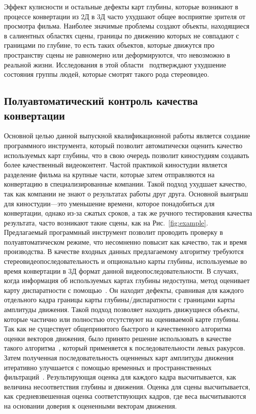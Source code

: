 \documentclass[14pt, a4paper]{extarticle}
\begin{document}
Эффект кулисности и остальные дефекты карт глубины, которые возникают в процессе 
конвертации из 2Д в 3Д часто ухудшают общее восприятие зрителя от просмотра фильма. 
Наиболее значимые проблемы создают объекты, находящиеся в салиентных областях 
сцены, границы по движению которых не совпадают с границами по глубине, то есть 
таких объектов, которые движутся про пространству сцены не равномерно или деформируются, 
что невозможно в реальной жизни. Исследования в этой области~\cite{jung2012visual,li2014visual} 
подтверждают ухудшение состояния группы людей, которые смотрят такого рода стереовидео.

\subsection{Полуавтоматический контроль качества конвертации}



Основной целью данной выпускной квалификационной работы 
является создание программного инструмента, 
который позволит автоматически оценить качество используемых карт глубины,
что в свою очередь позволит киностудиям создавать более качественный видеоконтент. 
Частой практикой киностудии является разделение фильма на крупные части, которые 
затем отправляются на конвертацию в специализированные компании. Такой подход 
ухудшает качество, так как компании не знают о результатах работы друг друга. 
Основной выигрыш для киностудии---это уменьшение времени, которое понадобиться 
для конвертации, однако из-за сжатых сроков, а так же ручного тестирования 
качества результата, часто возникают такие сцены, как на Рис.~\ref{fig:example}. 
Предлагаемый программный инструмент позволит проводить проверку в полуавтоматическом 
режиме, что несомненно повысит как качество, так и время производства.
В качестве входных данных предлагаемому алгоритму требуются стереовидеопоследовательность 
и опционально карты глубины, используемые во время конвертации в 3Д формат данной 
видеопоследовательности. В случаях, когда информация об используемых картах 
глубины недоступна, метод оценивает карту диспаратности с помощью~\cite{simonyan2008fast,zhang2014100+}. 
Он находит дефекты, сравнивая для каждого отдельного 
кадра границы карты глубины/диспаратности с границами карты 
амплитуды движения. Такой подход позволяет находить движущиеся объекты, которые 
частично или полностью отсутствуют на оцениваемой карте глубины. Так как не существует 
общепринятого быстрого и качественного алгоритма оценки векторов движения, было принято 
решение использовать в качестве такого алгоритма~\cite{simonyan2008fast}, который 
применяется к последовательности левых ракурсов. Затем полученная последовательность 
оценненых карт амплитуды движения итеративно улучшается с помощью временных и 
пространнственных фильтраций~\cite{fecker2007time,matyunin2011temporal,he2013guided}. 
Результирующая оценка для каждого кадра высчитывается, как величина несоответствия 
глубины и движения. Оценка для сцены высчитывается, как средневзвешенная оценка 
соответствующих кадров, где веса высчитываются на основании доверия 
к оцененными векторам движения.
\end{document}

